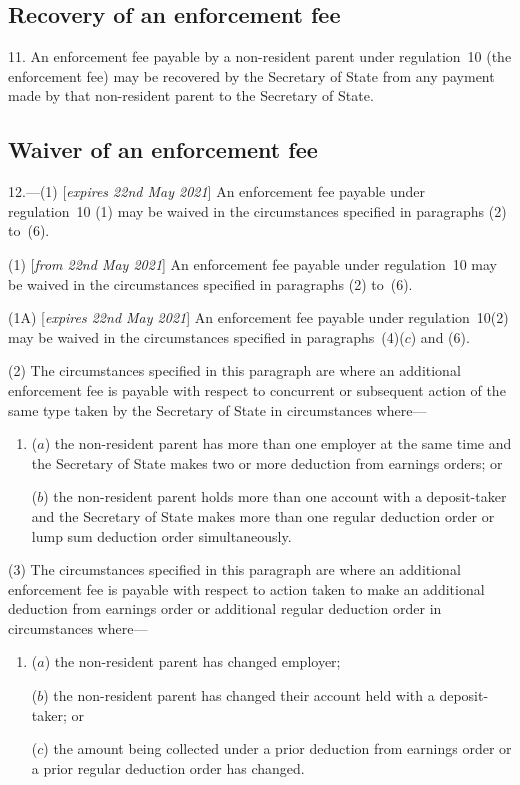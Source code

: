 \documentclass[12pt,a4paper]{article}
\begin{document}

\subsection[11. Recovery of an enforcement fee]{Recovery of an enforcement fee}

11.  An enforcement fee payable by a non-resident parent under regulation~10 (the enforcement fee) may be recovered by the Secretary of State from any payment made by that non-resident parent to the Secretary of State.

\subsection[12. Waiver of an enforcement fee]{Waiver of an enforcement fee}

12.—(1) [\emph{expires 22nd May 2021}] An enforcement fee payable under regulation~10%
(1)  %
may be waived in the circumstances specified in paragraphs (2) to~(6).

(1) [\emph{from 22nd May 2021}] An enforcement fee payable under regulation~10 may be waived in the circumstances specified in paragraphs (2) to~(6).

(1A) [\emph{expires 22nd May 2021}] 
    An enforcement fee payable under regulation~10(2) may be waived in the circumstances specified in paragraphs~(4)($c$) and (6).

(2) The circumstances specified in this paragraph are where an additional enforcement fee is payable with respect to concurrent or subsequent action of the same type taken by the Secretary of State in circumstances where—
\begin{enumerate}\item[]
($a$) the non-resident parent has more than one employer at the same time and the Secretary of State makes two or more deduction from earnings orders; or

($b$) the non-resident parent holds more than one account with a deposit-taker and the Secretary of State makes more than one regular deduction order or lump sum deduction order simultaneously.
\end{enumerate}

(3) The circumstances specified in this paragraph are where an additional enforcement fee is payable with respect to action taken to make an additional deduction from earnings order or additional regular deduction order in circumstances where—
\begin{enumerate}\item[]
($a$) the non-resident parent has changed employer;

($b$) the non-resident parent has changed their account held with a deposit-taker; or

($c$) the amount being collected under a prior deduction from earnings order or a prior regular deduction order has changed.
\end{enumerate}
\end{document}
